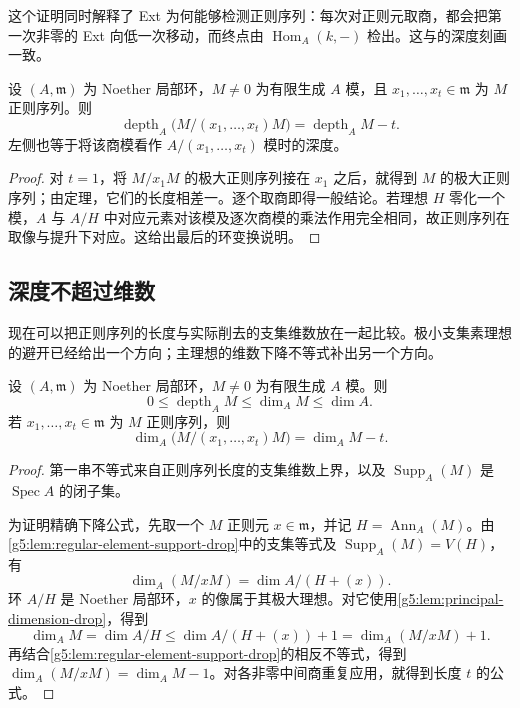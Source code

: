 这个证明同时解释了 Ext 为何能够检测正则序列：每次对正则元取商，都会把第一次非零的 Ext 向低一次移动，而终点由 \(\operatorname{Hom}_A(k,-)\) 检出。这与\cite[第16节，定理16.7，第130页]{Matsumura1989}的深度刻画一致。

\begin{corollary}\label{g5:cor:regular-depth-drop}
	设 \((A,\mathfrak m)\) 为 Noether 局部环，\(M\ne0\) 为有限生成 \(A\) 模，且 \(x_1,\ldots,x_t\in\mathfrak m\) 为 \(M\) 正则序列。则
	\[
		\operatorname{depth}_A\bigl(M/(x_1,\ldots,x_t)M\bigr)
		=\operatorname{depth}_A M-t.
	\]
	左侧也等于将该商模看作 \(A/(x_1,\ldots,x_t)\) 模时的深度。
\end{corollary}
\begin{proof}
	对 \(t=1\)，将 \(M/x_1M\) 的极大正则序列接在 \(x_1\) 之后，就得到 \(M\) 的极大正则序列；由定理，它们的长度相差一。逐个取商即得一般结论。若理想 \(H\) 零化一个模，\(A\) 与 \(A/H\) 中对应元素对该模及逐次商模的乘法作用完全相同，故正则序列在取像与提升下对应。这给出最后的环变换说明。
\end{proof}

\subsection{深度不超过维数}
\label{g5:subsec:0803:03}

现在可以把正则序列的长度与实际削去的支集维数放在一起比较。极小支集素理想的避开已经给出一个方向；主理想的维数下降不等式补出另一个方向。

\begin{theorem}\label{g5:thm:depth-dimension}
	设 \((A,\mathfrak m)\) 为 Noether 局部环，\(M\ne0\) 为有限生成 \(A\) 模。则
	\[
		0\leq\operatorname{depth}_A M\leq\dim_A M\leq\dim A.
	\]
	若 \(x_1,\ldots,x_t\in\mathfrak m\) 为 \(M\) 正则序列，则
	\[
		\dim_A\bigl(M/(x_1,\ldots,x_t)M\bigr)=\dim_A M-t.
	\]
\end{theorem}
\begin{proof}
	第一串不等式来自正则序列长度的支集维数上界，以及 \(\operatorname{Supp}_A(M)\) 是 \(\operatorname{Spec}A\) 的闭子集。

	为证明精确下降公式，先取一个 \(M\) 正则元 \(x\in\mathfrak m\)，并记 \(H=\operatorname{Ann}_A(M)\)。由\cref{g5:lem:regular-element-support-drop}中的支集等式及 \(\operatorname{Supp}_A(M)=V(H)\)，有
	\[
		\dim_A(M/xM)=\dim A/(H+(x)).
	\]
	环 \(A/H\) 是 Noether 局部环，\(x\) 的像属于其极大理想。对它使用\cref{g5:lem:principal-dimension-drop}，得到
	\[
		\dim_A M=\dim A/H
		\leq\dim A/(H+(x))+1
		=\dim_A(M/xM)+1.
	\]
	再结合\cref{g5:lem:regular-element-support-drop}的相反不等式，得到 \(\dim_A(M/xM)=\dim_A M-1\)。对各非零中间商重复应用，就得到长度 \(t\) 的公式。
\end{proof}

